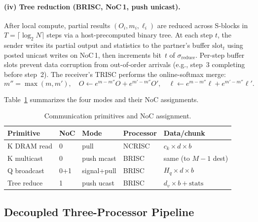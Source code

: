 \documentclass[sigconf, review, anonymous]{acmart}
\newcommand{\SblockNames}{S-blocks}
\begin{document}
\paragraph{(iv) Tree reduction (BRISC, NoC\,1, push unicast).}
After local compute, partial results $(O_i, m_i, \ell_i)$ are
reduced across \SblockNames{} in $T = \lceil\log_2 N\rceil$ steps via a
host-precomputed binary tree.  At each step $t$, the sender writes
its partial output and statistics to the partner's buffer
$\mathrm{slot}_t$ using posted unicast writes on NoC\,1, then
increments bit~$t$ of $\sigma_{\mathrm{reduce}}$.
Per-step buffer slots prevent data corruption from out-of-order
arrivals (e.g., step~3 completing before step~2).
The receiver's TRISC performs the online-softmax merge:
\begin{equation}\label{eq:tail-merge}
  m'' = \max(m, m'), \quad
  O \leftarrow e^{m-m''}O + e^{m'-m''}O', \quad
  \ell \leftarrow e^{m-m''}\ell + e^{m'-m''}\ell'.
\end{equation}

Table~\ref{tab:comm-summary} summarizes the four modes and their
NoC assignments.

\begin{table}[t]
  \caption{Communication primitives and NoC assignment.}
  \label{tab:comm-summary}
  \centering\small
  \begin{tabular}{lllll}
    \toprule
    \textbf{Primitive} & \textbf{NoC} & \textbf{Mode} &
      \textbf{Processor} & \textbf{Data/chunk} \\
    \midrule
    K DRAM read   & 0 & pull      & NCRISC & $c_k \!\times\! d \!\times\! b$ \\
    K multicast   & 0 & push mcast & BRISC & same (to $M{-}1$ dest) \\
    Q broadcast   & 0+1 & signal+pull & BRISC & $H_q \!\times\! d \!\times\! b$ \\
    Tree reduce   & 1 & push ucast & BRISC & $d_v \!\times\! b + \mathrm{stats}$ \\
    \bottomrule
  \end{tabular}
\end{table}



\subsection{Decoupled Three-Processor Pipeline}\label{sec:design-pipeline}
\end{document}
